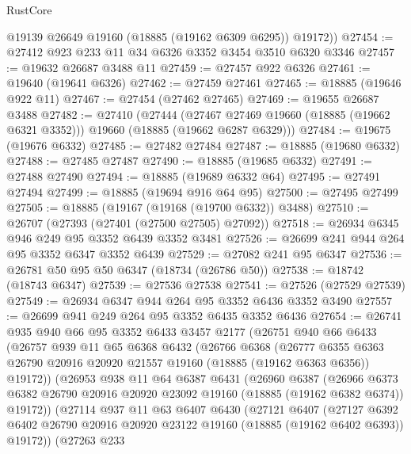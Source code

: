 \begin{lexlean}{RustCore}
\begin{coremodule}
        @19139
        @26649
        @19160
        (@18885 (@19162 @6309 @6295))
        @19172))
@27454 := @27412 @923 @233 @11 @34 @6326 @3352 @3454 @3510 @6320 @3346
@27457 := @19632 @26687 @3488 @11
@27459 := @27457 @922 @6326
@27461 := @19640 (@19641 @6326)
@27462 := @27459 @27461
@27465 := @18885 (@19646 @922 @11)
@27467 := @27454 (@27462 @27465)
@27469 := @19655 @26687 @3488
@27482 := @27410
    (@27444
      (@27467 @27469 @19660 (@18885 (@19662 @6321 @3352)))
      @19660
      (@18885 (@19662 @6287 @6329)))
@27484 := @19675 (@19676 @6332)
@27485 := @27482 @27484
@27487 := @18885 (@19680 @6332)
@27488 := @27485 @27487
@27490 := @18885 (@19685 @6332)
@27491 := @27488 @27490
@27494 := @18885 (@19689 @6332 @64)
@27495 := @27491 @27494
@27499 := @18885 (@19694 @916 @64 @95)
@27500 := @27495 @27499
@27505 := @18885 (@19167 (@19168 (@19700 @6332)) @3488)
@27510 := @26707 (@27393 (@27401 (@27500 @27505) @27092))
@27518 := @26934 @6345 @946 @249 @95 @3352 @6439 @3352 @3481
@27526 := @26699 @241 @944 @264 @95 @3352 @6347 @3352 @6439
@27529 := @27082 @241 @95 @6347
@27536 := @26781 @50 @95 @50 @6347 (@18734 (@26786 @50))
@27538 := @18742 (@18743 @6347)
@27539 := @27536 @27538
@27541 := @27526 (@27529 @27539)
@27549 := @26934 @6347 @944 @264 @95 @3352 @6436 @3352 @3490
@27557 := @26699 @941 @249 @264 @95 @3352 @6435 @3352 @6436
@27654 := @26741
    @935
    @940
    @66
    @95
    @3352
    @6433
    @3457
    @2177
    (@26751
      @940
      @66
      @6433
      (@26757
        @939
        @11
        @65
        @6368
        @6432
        (@26766
          @6368
          (@26777
            @6355
            @6363
            @26790
            @20916
            @20920
            @21557
            @19160
            (@18885 (@19162 @6363 @6356))
            @19172))
        (@26953
          @938
          @11
          @64
          @6387
          @6431
          (@26960
            @6387
            (@26966
              @6373
              @6382
              @26790
              @20916
              @20920
              @23092
              @19160
              (@18885 (@19162 @6382 @6374))
              @19172))
          (@27114
            @937
            @11
            @63
            @6407
            @6430
            (@27121
              @6407
              (@27127
                @6392
                @6402
                @26790
                @20916
                @20920
                @23122
                @19160
                (@18885 (@19162 @6402 @6393))
                @19172))
            (@27263
              @233

\end{coremodule}
\end{lexlean}
